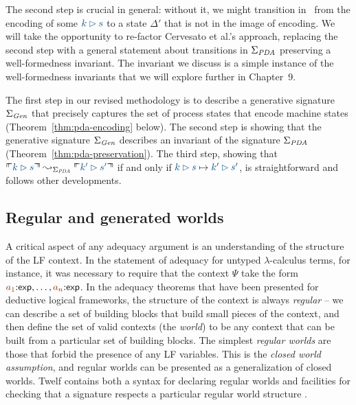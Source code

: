 The second step is crucial in general: without it, we might transition
in \sls~from the encoding of some $\obj{k \rhd s}$ to a state
$\Delta'$ that is not in the image of encoding. %
We will 
take the opportunity to re-factor Cervesato et al.'s approach, 
replacing the second step with a general statement about transitions
in $\Sigma_{\it PDA}$ preserving a well-formedness invariant. The 
invariant we discuss is a simple instance of
the well-formedness invariants that we will explore
further in Chapter~9. 

The first step in our revised methodology is to describe a generative
signature $\Sigma_{\it Gen}$ that precisely captures the set of
process states that encode machine states
(Theorem~\ref{thm:pda-encoding} below).  The second step is showing
that the generative signature $\Sigma_{\it Gen}$ describes an
invariant of the signature $\Sigma_{\it PDA}$
(Theorem~\ref{thm:pda-preservation}).  The third step, showing that
$\ctxinterp{k \rhd s} \leadsto_{\Sigma_{\it PDA}} \ctxinterp{k' \rhd
  s'}$ if and only if $\obj{k \rhd s} \mapsto \obj{k' \rhd s'}$, is
straightforward and follows other developments.

\subsection{Regular and generated worlds}

A critical aspect of any adequacy argument is an understanding of the
structure of the LF context. In the statement of adequacy for untyped
$\lambda$-calculus terms, for instance, it was necessary to require
that the context $\Psi$ take the form $\lf{a_1}{:}{\sf
  exp},\ldots,\lf{a_n}{:}{\sf exp}$. In the adequacy theorems that
have been presented for deductive logical frameworks, the structure of
the context is always {\it regular} -- we can describe a set of
building blocks that build small pieces of the context, and then
define the set of valid contexts (the {\it world}) to be any context
that can be built from a particular set of building blocks.  The
simplest {\it regular worlds} are those that forbid the presence of
any LF variables. This is the {\it closed world assumption}, and
regular worlds can be presented as a generalization of closed worlds.
Twelf contains both
a syntax for declaring regular worlds and facilities for checking that a
signature respects a particular regular world structure
\cite{schurmann00automating}.

